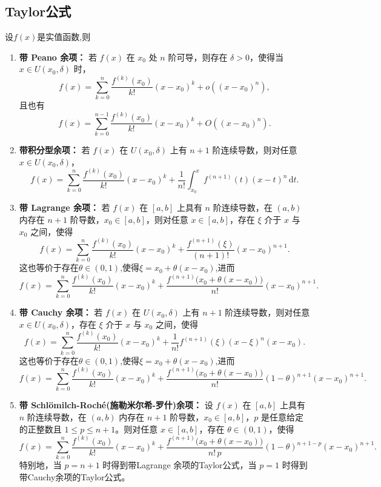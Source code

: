 \documentclass[../../main.tex]{subfiles}%
\begin{document}
\subsection{Taylor公式}

\begin{theorem}[Taylor定理]\label{theorem:带各种余项的Taylor公式}
设$f(x)$是实值函数,则
\begin{enumerate}[(1)]
\item \textbf{带 Peano 余项：} 
若 $f(x)$ 在 $x_0$ 处 $n$ 阶可导，则存在 $\delta > 0$，使得当 $x \in U(x_0,\delta)$ 时，
\[
f(x)=\sum_{k=0}^{n}\frac{f^{(k)}(x_0)}{k!}(x-x_0)^k + o\!\left((x-x_0)^n\right),
\]
且也有
\[
f(x)=\sum_{k=0}^{n-1}\frac{f^{(k)}(x_0)}{k!}(x-x_0)^k + O\!\left((x-x_0)^{n}\right).
\]

\item \textbf{带积分型余项：}
若 $f(x)$ 在 $U(x_0,\delta)$ 上有 $n+1$ 阶连续导数，则对任意 $x\in U(x_0,\delta)$，
\[
f(x)=\sum_{k=0}^{n}\frac{f^{(k)}(x_0)}{k!}(x-x_0)^k + \frac{1}{n!}\int_{x_0}^{x} f^{(n+1)}(t)(x-t)^n\,\mathrm{d}t.
\]

\item \textbf{带 Lagrange 余项：}
若 $f(x)$ 在 $[a,b]$ 上具有 $n$ 阶连续导数，在 $(a,b)$ 内存在 $n+1$ 阶导数，$x_0\in[a,b]$，则对任意 $x\in[a,b]$，存在 $\xi$ 介于 $x$ 与 $x_0$ 之间，使得
\[
f(x)=\sum_{k=0}^{n}\frac{f^{(k)}(x_0)}{k!}(x-x_0)^k + \frac{f^{(n+1)}(\xi)}{(n+1)!}(x-x_0)^{n+1}.
\]
这也等价于存在$\theta \in (0,1)$,使得$\xi =x_0+\theta(x-x_0)$,进而
\[
f(x)=\sum_{k=0}^{n}\frac{f^{(k)}(x_0)}{k!}(x-x_0)^k + \frac{f^{(n+1)}\!\bigl(x_0+\theta(x-x_0)\bigr)}{n!}(x-x_0)^{n+1}.
\]

\item \textbf{带 Cauchy 余项：}
若 $f(x)$ 在 $U(x_0,\delta)$ 上有 $n+1$ 阶连续导数，则对任意 $x\in U(x_0,\delta)$，存在 $\xi$ 介于 $x$ 与 $x_0$ 之间，使得
\[
f(x)=\sum_{k=0}^{n}\frac{f^{(k)}(x_0)}{k!}(x-x_0)^k + \frac{1}{n!}f^{(n+1)}(\xi)(x-\xi)^n(x-x_0).
\]
这也等价于存在$\theta \in (0,1)$,使得$\xi =x_0+\theta(x-x_0)$,进而
\[
f(x)=\sum_{k=0}^{n}\frac{f^{(k)}(x_0)}{k!}(x-x_0)^k + \frac{f^{(n+1)}\!\bigl(x_0+\theta(x-x_0)\bigr)}{n!}(1-\theta)^{n+1}(x-x_0)^{n+1}.
\]

\item \textbf{带 Schlömilch-Roché(施勒米尔希-罗什)余项：}
设 $f(x)$ 在 $[a,b]$ 上具有 $n$ 阶连续导数，在 $(a,b)$ 内存在 $n+1$ 阶导数，$x_0\in[a,b]$，$p$ 是任意给定的正整数且 $1\leqslant p\leqslant n+1$。则对任意 $x\in[a,b]$，存在 $\theta\in(0,1)$，使得
\[
f(x)=\sum_{k=0}^{n}\frac{f^{(k)}(x_0)}{k!}(x-x_0)^k + \frac{f^{(n+1)}\!\bigl(x_0+\theta(x-x_0)\bigr)}{n!\,p}(1-\theta)^{n+1-p}(x-x_0)^{n+1}.
\]
特别地，当 $p=n+1$ 时得到带Lagrange 余项的Taylor公式，当 $p=1$ 时得到 带Cauchy余项的Taylor公式。
\end{enumerate}
\end{theorem}
\end{document}
